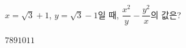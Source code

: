 $x=\sqrt{3}+1$, $y=\sqrt{3}-1$일 때, $\dfrac{x^2}{y}-\dfrac{y^2}{x}$의 값은?
\begin{choices32}{$7$}{$8$}{$9$}{$10$}{$11$}\end{choices32}
